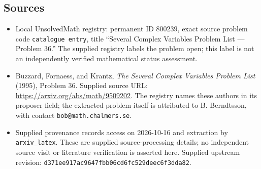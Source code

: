 \documentclass[11pt]{article}
\begin{document}
\subsection{Sources}
\begin{itemize}
\item Local UnsolvedMath registry: permanent ID \(800239\), exact source problem code \texttt{catalogue entry}, title ``Several Complex Variables Problem List — Problem 36.'' The supplied registry labels the problem open; this label is not an independently verified mathematical status assessment.
\item Buzzard, Fornaess, and Krantz, \emph{The Several Complex Variables Problem List} (1995), Problem 36. Supplied source URL: \url{https://arxiv.org/abs/math/9509202}. The registry names these authors in its proposer field; the extracted problem itself is attributed to B. Berndtsson, with contact \texttt{bob@math.chalmers.se}.
\item Supplied provenance records access on 2026-10-16 and extraction by \texttt{arxiv\_latex}. These are supplied source-processing details; no independent source visit or literature verification is asserted here. Supplied upstream revision: \texttt{d371ee917ac9647fbb06cd6fc529deec6f3dda82}.
\end{itemize}
\end{document}
